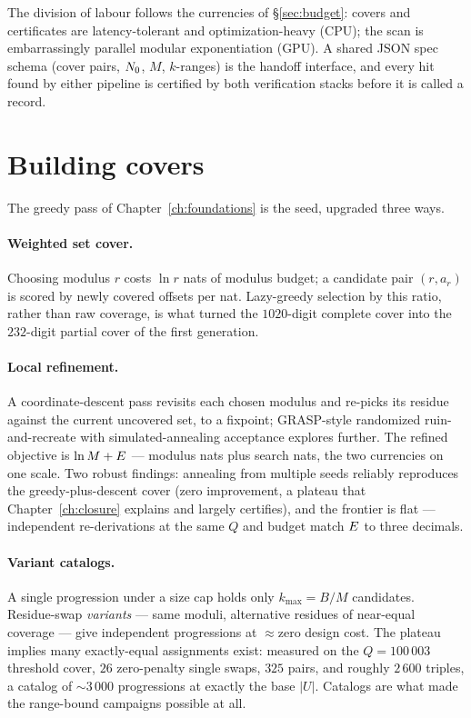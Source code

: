 The division of labour follows the currencies of
\S\ref{sec:budget}: covers and certificates are latency-tolerant and
optimization-heavy (CPU); the scan is embarrassingly parallel
modular exponentiation (GPU). A shared JSON spec schema (cover pairs,
$N_0$, $M$, $k$-ranges) is the handoff interface, and every hit found
by either pipeline is certified by both verification stacks before it is
called a record.

\section{Building covers}\label{sec:covers}

The greedy pass of Chapter~\ref{ch:foundations} is the seed, upgraded
three ways.

\paragraph{Weighted set cover.} Choosing modulus $r$ costs $\ln r$ nats
of modulus budget; a candidate pair $(r,a_r)$ is scored by newly covered
offsets per nat. Lazy-greedy selection by this ratio, rather than raw
coverage, is what turned the $1020$-digit complete cover into the
$232$-digit partial cover of the first generation.

\paragraph{Local refinement.} A coordinate-descent pass revisits each
chosen modulus and re-picks its residue against the current uncovered
set, to a fixpoint; GRASP-style randomized ruin-and-recreate with
simulated-annealing acceptance explores further. The refined objective
is $\ln M+E$ --- modulus nats plus search nats, the two currencies on
one scale. Two robust findings: annealing from multiple seeds reliably
reproduces the greedy-plus-descent cover (zero improvement, a plateau
that Chapter~\ref{ch:closure} explains and largely certifies), and the
frontier is flat --- independent re-derivations at the same $Q$ and
budget match $E$ to three decimals.

\paragraph{Variant catalogs.} A single progression under a size cap
holds only $k_{\max}=B/M$ candidates. Residue-swap \emph{variants} ---
same moduli, alternative residues of near-equal coverage --- give
independent progressions at $\approx$zero design cost. The plateau
implies many exactly-equal assignments exist: measured on the
$Q=100\,003$ threshold cover, $26$ zero-penalty single swaps, $325$
pairs, and roughly $2\,600$ triples, a catalog of $\sim3\,000$
progressions at exactly the base $|U|$. Catalogs are what made the
range-bound campaigns possible at all.

